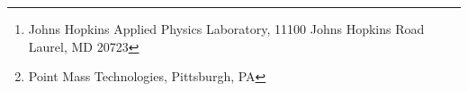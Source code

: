 \author{Ben Schilling\thanks{Johns Hopkins Applied Physics Laboratory, 11100 Johns Hopkins Road Laurel, MD 20723}, Timothy G. McGee\thanks{Point Mass Technologies, Pittsburgh, PA}, Ryan Mitch\footnotemark[1], and Ryan Watson\footnotemark[1] \\ }